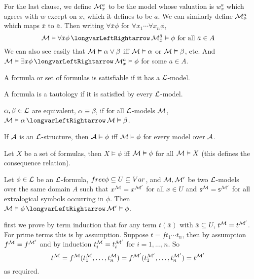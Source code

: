 For the last clause, we define ${\cal M}^a_x$ to be the model whose valuation is $w^a_x$ which agrees
with $w$ except on $x$, which it defines to be $a$.
We can similarly define ${\cal M}^{\bar a}_{\bar x}$ which maps $\bar x$ to $\bar a$.
Then writing $\forall\bar x\phi$ for $\forall x_1\cdots\forall x_n\phi$,
$$ \c M\vDash\forall\bar x\phi \iff \c M^{\bar a}_{\bar x}\vDash\phi\hbox{ for all $\bar a\in A$}
$$
We can also see easily that ${\cal M}\vDash\alpha\lor\beta$ iff ${\cal M}\vDash\alpha$ or
${\cal M}\vDash\beta$, etc.
And $\c M\vDash\exists x\phi\iff\c M^a_x\vDash\phi$ for some $a\in A$.

\bdefn

    \benum
        \item A formula or set of formulas is {\emphcolor satisfiable} if it has a ${\cal L}$-model.
        \item A formula is a {\emphcolor tautology} if it is satisfied by every ${\cal L}$-model.
        \item $\alpha,\beta\in{\cal L}$ are {\emphcolor equivalent}, $\alpha\equiv\beta$, if for all
        ${\cal L}$-models ${\cal M}$, $\c M\vDash\alpha\iff\c M\vDash\beta$.
        \item If ${\cal A}$ is an ${\cal L}$-structure, then ${\cal A}\vDash\phi$ iff ${\cal M}\vDash\phi$ for
                every model over ${\cal A}$.
        \item Let $X$ be a set of formulas, then $X\vDash\phi$ iff ${\cal M}\vDash\phi$ for all
                ${\cal M}\vDash X$ (this defines the consequence relation).
    \eenum

\edefn

\blemm[title=The Coincidence Lemma]

    Let $\phi\in{\cal L}$ be an ${\cal L}$-formula, ${\sl free}\phi\subseteq U\subseteq {\sl Var}$, and ${\cal M},{\cal M}'$ be two ${\cal L}$-models over the same domain $A$ such that $x^{{\cal M}}=x^{{\cal M}'}$ for all $x\in U$ and
    ${\sf s}^{{\cal M}}={\sf s}^{{\cal M}'}$ for all extralogical symbols occurring in $\phi$.
    Then $\c M\vDash\phi\iff\c M'\vDash\phi$.

\elemm

\Proof first we prove by term induction that for any term $t(\bar x)$ with $\bar x\subseteq U$, $t^{{\cal M}}=t^{{\cal M}'}$.
For prime terms this is by assumption.
Suppose $t=ft_1\cdots t_n$, then by assumption $f^{{\cal M}}=f^{{\cal M}'}$ and by induction $t_i^{{\cal M}}=t_i^{{\cal M}'}$ for $i=1,\dots,n$.
So
$$ t^{{\cal M}} = f^{{\cal M}}(t_1^{{\cal M}},\dots,t_n^{{\cal M}}) = f^{{\cal M}'}(t_1^{{\cal M}'},\dots,t_n^{{\cal M}'}) = t^{{\cal M}'} $$
as required.

